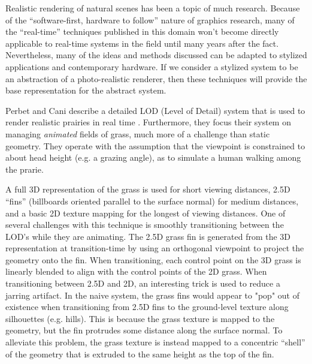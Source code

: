\documentclass[notitlepage]{report}
\begin{document}
    Realistic rendering of natural scenes has been a topic of much research. Because of the ``software-first, hardware to follow'' nature of graphics research, many of the ``real-time'' techniques published in this domain won't become directly applicable to real-time systems in the field until many years after the fact. Nevertheless, many of the ideas and methods discussed can be adapted to stylized applications and contemporary hardware. If we consider a stylized system to be an abstraction of a photo-realistic renderer, then these techniques will provide the base representation for the abstract system. 

    Perbet and Cani describe a detailed LOD (Level of Detail) system that is used to render realistic prairies in real time \cite{Perbet2001}. Furthermore, they focus their system on managing \emph{animated} fields of grass, much more of a challenge than static geometry. They operate with the assumption that the viewpoint is constrained to about head height (e.g. a grazing angle), as to simulate a human walking among the prarie. 

    A full 3D representation of the grass is used for short viewing distances, 2.5D “fins” (billboards oriented parallel to the surface normal) for medium distances, and a basic 2D texture mapping for the longest of viewing distances. One of several challenges with this technique is smoothly transitioning between the LOD’s while they are animating. The 2.5D grass fin is generated from the 3D representation at transition-time by using an orthogonal viewpoint to project the geometry onto the fin. When transitioning, each control point on the 3D grass is linearly blended to align with the control points of the 2D grass. When transitioning between 2.5D and 2D, an interesting trick is used to reduce a jarring artifact. In the naive system, the grass fins would appear to "pop" out of existence when transitioning from 2.5D fins to the ground-level texture along silhouettes (e.g. hills). This is because the grass texture is mapped to the geometry, but the fin protrudes some distance along the surface normal. To alleviate this problem, the grass texture is instead mapped to a concentric ``shell'' of the geometry that is extruded to the same height as the top of the fin.
\end{document}
